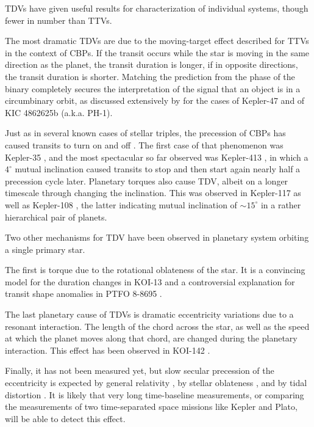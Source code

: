 \documentclass[graybox,natbib,nosecnum]{svmult}
\begin{document}
TDVs have given useful results for characterization of individual systems, though fewer in number than TTVs.

The most dramatic TDVs are due to the moving-target effect described for TTVs in the context of CBPs.  If the transit occurs while the star is moving in the same direction as the planet, the transit duration is longer, if in opposite directions, the transit duration is shorter.  Matching the prediction from the phase of the binary completely secures the interpretation of the signal that an object is in a circumbinary orbit, as discussed extensively by \cite{2013ApJ...770...52K} for the cases of Kepler-47 and of KIC 4862625b (a.k.a. PH-1). 

Just as in several known cases of stellar triples, the precession of CBPs has caused transits to turn on and off \citep{2017MNRAS.465.3235M}.  The first case of that phenomenon was Kepler-35 \citep{2012Natur.481..475W}, and the most spectacular so far observed was Kepler-413 \citep{2014ApJ...784...14K}, in which a $4^\circ$ mutual inclination caused transits to stop and then start again nearly half a precession cycle later.  Planetary torques also cause TDV, albeit on a longer timescale through changing the inclination.  This was observed in Kepler-117 \citep{2015MNRAS.453.2644A} as well as Kepler-108 \citep{1538-3881-153-1-45}, the latter indicating mutual inclination of $\sim 15^\circ$ in a rather hierarchical pair of planets. 

Two other mechanisms for TDV have been observed in planetary system orbiting a single primary star.

The first is torque due to the rotational oblateness of the star.  It is a convincing model for the duration changes in KOI-13 \citep{2015MNRAS.453.2644A} and a controversial explanation for transit shape anomalies in PTFO 8-8695 \citep{2013ApJ...774...53B}. 

The last planetary cause of TDVs is dramatic eccentricity variations due to a resonant interaction.  The length of the chord across the star, as well as the speed at which the planet moves along that chord, are changed during the planetary interaction.  This effect has been observed in KOI-142 \citep{2013ApJ...777....3N}.

Finally, it has not been measured yet, but slow secular precession of the eccentricity is expected by general relativity \citep{2008MNRAS.389..191P}, by stellar oblateness \citep{2007MNRAS.377.1511H}, and by tidal distortion \citep{2009ApJ...698.1778R}.  It is likely that very long time-baseline measurements, or comparing the measurements of two time-separated space missions like Kepler and Plato, will be able to detect this effect.
\end{document}

